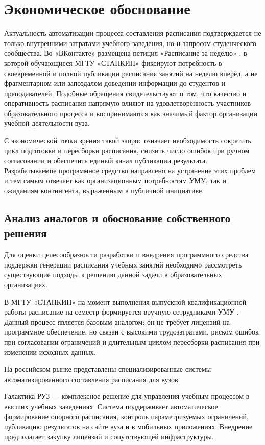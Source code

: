 \section{Экономическое обоснование}

Актуальность автоматизации процесса составления расписания подтверждается не только внутренними затратами учебного заведения, но и запросом студенческого сообщества. Во «ВКонтакте» размещена петиция «Расписание за неделю» \cite{vk:schedule_petition}, в которой обучающиеся МГТУ «СТАНКИН» фиксируют потребность в своевременной и полной публикации расписания занятий на неделю вперёд, а не фрагментарном или запоздалом доведении информации до студентов и преподавателей. Подобные обращения свидетельствуют о том, что качество и оперативность расписания напрямую влияют на удовлетворённость участников образовательного процесса и воспринимаются как значимый фактор организации учебной деятельности вуза.

С экономической точки зрения такой запрос означает необходимость сократить цикл подготовки и пересборки расписания, снизить число ошибок при ручном согласовании и обеспечить единый канал публикации результата. Разрабатываемое программное средство направлено на устранение этих проблем и тем самым отвечает как организационным потребностям УМУ, так и ожиданиям контингента, выраженным в публичной инициативе.

\subsection{Анализ аналогов и обоснование собственного решения}

Для оценки целесообразности разработки и внедрения программного средства поддержки генерации расписания учебных занятий необходимо рассмотреть существующие подходы к решению данной задачи в образовательных организациях.

В МГТУ «СТАНКИН» на момент выполнения выпускной квалификационной работы расписание на семестр формируется вручную сотрудниками УМУ \cite{stankin:schedule}. Данный процесс является базовым аналогом: он не требует лицензий на программное обеспечение, но связан с высокими трудозатратами, риском ошибок при согласовании ограничений и длительным циклом пересборки расписания при изменении исходных данных.

На российском рынке представлены специализированные системы автоматизированного составления расписания для вузов.

Галактика РУЗ \cite{galaktika:ruz} --- комплексное решение для управления учебным процессом в высших учебных заведениях. Система поддерживает автоматическое формирование опорного расписания, контроль параметризуемых ограничений, публикацию результатов на сайте вуза и в мобильных приложениях. Внедрение предполагает закупку лицензий и сопутствующей инфраструктуры.

